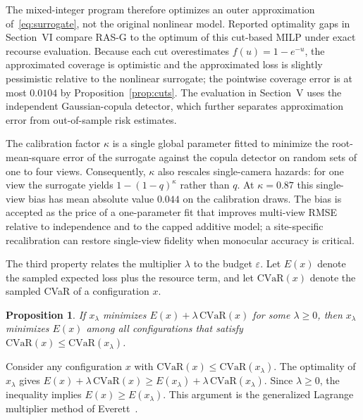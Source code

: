 \documentclass[letterpaper,journal]{IEEEtran}
\newtheorem{proposition}{Proposition}
\begin{document}
The mixed-integer program therefore optimizes an outer approximation of~\eqref{eq:surrogate}, not the original nonlinear model. Reported optimality gaps in Section~VI compare RAS-G to the optimum of this cut-based MILP under exact recourse evaluation. Because each cut overestimates $f(u)=1-e^{-u}$, the approximated coverage is optimistic and the approximated loss is slightly pessimistic relative to the nonlinear surrogate; the pointwise coverage error is at most $0.0104$ by Proposition~\ref{prop:cuts}. The evaluation in Section~V uses the independent Gaussian-copula detector, which further separates approximation error from out-of-sample risk estimates.

The calibration factor $\kappa$ is a single global parameter fitted to minimize the root-mean-square error of the surrogate against the copula detector on random sets of one to four views. Consequently, $\kappa$ also rescales single-camera hazards: for one view the surrogate yields $1-(1-q)^{\kappa}$ rather than $q$. At $\kappa=0.87$ this single-view bias has mean absolute value $0.044$ on the calibration draws. The bias is accepted as the price of a one-parameter fit that improves multi-view RMSE relative to independence and to the capped additive model; a site-specific recalibration can restore single-view fidelity when monocular accuracy is critical.

The third property relates the multiplier $\lambda$ to the budget $\varepsilon$. Let $E(x)$ denote the sampled expected loss plus the resource term, and let $\mathrm{CVaR}(x)$ denote the sampled CVaR of a configuration $x$.

\begin{proposition}\label{prop:lag}
If $x_\lambda$ minimizes $E(x)+\lambda\,\mathrm{CVaR}(x)$ for some $\lambda\ge0$, then $x_\lambda$ minimizes $E(x)$ among all configurations that satisfy $\mathrm{CVaR}(x)\le\mathrm{CVaR}(x_\lambda)$.
\end{proposition}
\begin{IEEEproof}
Consider any configuration $x$ with $\mathrm{CVaR}(x)\le\mathrm{CVaR}(x_\lambda)$. The optimality of $x_\lambda$ gives $E(x)+\lambda\,\mathrm{CVaR}(x)\ge E(x_\lambda)+\lambda\,\mathrm{CVaR}(x_\lambda)$. Since $\lambda\ge0$, the inequality implies $E(x)\ge E(x_\lambda)$. This argument is the generalized Lagrange multiplier method of Everett~\cite{everett1963}.
\end{IEEEproof}
\end{document}
